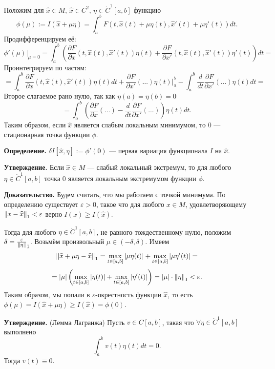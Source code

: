 Положим для $\widehat x \in M$, $\widehat x \in C^2$, $\eta \in \mathring C^1[a, b]$ функцию
\[
    \phi(\mu) := I(\widehat x + \mu \eta) = \int_a^b F(t, \widehat x(t) + \mu \eta(t), \widehat x'(t) + \mu \eta'(t)) dt.
\]
Продифференцируем её:
\[
    \phi'(\mu)|_{\mu = 0} = \int_a^b \left( \frac{\partial F}{\partial x}(t, \widehat x(t), \widehat x'(t)) \eta(t) + \frac{\partial F}{\partial x'}(t, \widehat x(t), \widehat x'(t)) \eta'(t) \right) dt =
\]
Проинтегрируем по частям:
\[
    = \int_a^b \frac{\partial F}{\partial x}(t, \widehat x(t), \widehat x'(t)) \eta(t) dt + \frac{\partial F}{\partial x'}(\dots) \eta(t) \big|_a^b - \int_a^b \frac{d}{dt} \frac{\partial F}{\partial x'}(\dots) \eta(t) dt =
\]
Второе слагаемое рано нулю, так как $\eta(a) = \eta(b) = 0$
\[
    = \int_a^b \left(\frac{\partial F}{\partial x}(\dots) - \frac{d}{dt} \frac{\partial F}{\partial x'}(\dots) \right) \eta(t) dt.
\]
Таким образом, если $\widehat x$ является слабым локальным минимумом, то 0 --- стационарная точка функции $\phi$.

\textbf{Определение.} $\delta I[\widehat x, \eta] := \phi'(0)$ --- первая вариация функционала $I$ на $\widehat x$.

\textbf{Утверждение.} Если $\widehat x \in M$ --- слабый локальный экстремум, то для любого $\eta \in \mathring C^1[a, b]$ точка $0$ является локальным экстремумом функции $\phi$.

\textbf{Доказательство.} Будем считать, что мы работаем с точкой минимума.
По определению существует $\varepsilon > 0$, такое что для любого $x \in M$, удовлетворяющему $\left\| x - \widehat x \right\|_1 < \varepsilon$ верно $I(x) \ge I(\widehat x)$.

Тогда для любого $\eta \in \mathring C^1[a, b]$, не равного тождественному нулю, положим $\delta = \frac{\varepsilon}{\left\| \eta \right\|}_1$.
Возьмём произвольный $\mu \in (-\delta, \delta)$.
Имеем
\[
    \left\| \widehat x + \mu \eta - \widehat x \right\|_1 = \max_{t \in [a, b]} |\mu \eta(t)| + \max_{t \in [a, b]} |\mu \eta'(t)| =
\]
\[
    = |\mu| \left( \max_{t \in [a, b]} |\eta(t)| + \max_{t \in [a, b]} |\eta'(t)| \right) = |\mu| \cdot \left\| \eta \right\|_1 < \varepsilon.
\]
Таким образом, мы попали в $\varepsilon$-окрестность функции $\widehat x$, то есть $\phi(\mu) = I(\widehat x + \mu \eta) \ge I(\widehat x) = \phi(0)$.

\QED

\textbf{Утверждение.} (Лемма Лагранжа) Пусть $v \in C[a, b]$, такая что $\forall \eta \in \mathring C^1[a, b]$ выполнено
\[
     \int_a^b v(t) \eta(t) dt = 0.
\]
Тогда $v(t) \equiv 0$.


